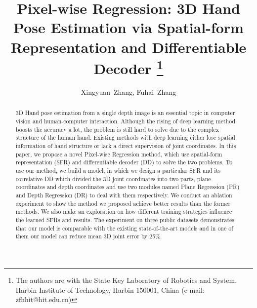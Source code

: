 \documentclass[journal]{IEEEtran}
\begin{document}
\title{Pixel-wise Regression: 3D Hand Pose Estimation via Spatial-form Representation and Differentiable Decoder
\thanks{The authors are with the State Key Laboratory of Robotics and System, Harbin Institute of Technology, Harbin 150001, China (e-mail: zfhhit@hit.edu.cn)}
}


\author{Xingyuan~Zhang,
        Fuhai~Zhang
        }



















\maketitle

\begin{abstract}
  3D Hand pose estimation from a single depth image is an essential topic in computer vision and human-computer interaction. 
  Although the rising of deep learning method boosts the accuracy a lot, the problem is still hard to solve due to the complex structure of the human hand. 
  Existing methods with deep learning either lose spatial information of hand structure or lack a direct supervision of joint coordinates. 
  In this paper, we propose a novel Pixel-wise Regression method, which use spatial-form representation (SFR) and differentiable decoder (DD) to solve the two problems. 
  To use our method, we build a model, in which we design a particular SFR and its correlative DD which divided the 3D joint coordinates into two parts, 
  plane coordinates and depth coordinates and use two modules named Plane Regression (PR) and Depth Regression (DR) to deal with them respectively. 
  We conduct an ablation experiment to show the method we proposed achieve better results than the former methods. 
  We also make an exploration on how different training strategies influence the learned SFRs and results. 
  The experiment on three public datasets demonstrates that our model is comparable with the existing state-of-the-art models and in one of them our model can reduce mean 3D joint error by 25\%.
\end{abstract}
\end{document}
